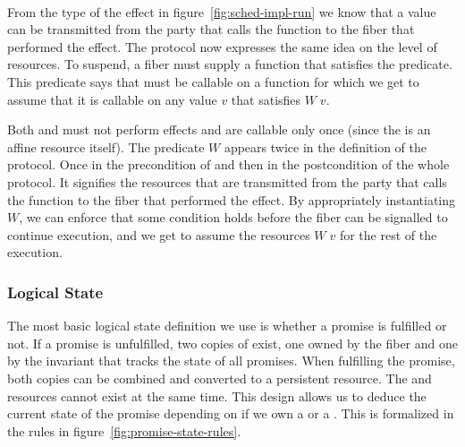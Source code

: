 \paragraph*{\esuspend{}}
From the type of the \esuspend{} effect in figure~\ref{fig:sched-impl-run} we know that a value can be transmitted from the party that calls the  function to the fiber that performed the effect.
The \esuspend{} protocol now expresses the same idea on the level of resources.
To suspend, a fiber must supply a function  that satisfies the \gsIsReg{} predicate.
This predicate says that  must be callable on a  function for which we get to assume that it is callable on any value \(v\) that satisfies \(W\; v\).

Both  and  must not perform effects and are callable only once (since the \ewpt{} is an affine resource itself).
The predicate \(W\) appears twice in the definition of the protocol.
Once in the precondition of  and then in the postcondition of the whole protocol.
It signifies the resources that are transmitted from the party that calls the  function to the fiber that performed the effect.
By appropriately instantiating \(W\), we can enforce that some condition holds before the fiber can be signalled to continue execution, and we get to assume the resources \(W\; v\) for the rest of the execution.

\subsubsection{Logical State}
\label{sec:sched-spec-state}

The most basic logical state definition we use is whether a promise is fulfilled or not.
If a promise  is unfulfilled, two copies of \gspwait{} exist, one owned by the fiber and one by the invariant that tracks the state of all promises.
When fulfilling the promise, both copies can be combined and converted to a persistent \gspdone{} resource.
The \gspwait{} and \gspdone{} resources cannot exist at the same time.
This design allows us to deduce the current state of the promise depending on if we own a \gspwait{} or a \gspdone{}.
This is formalized in the rules in figure~\ref{fig:promise-state-rules}.

